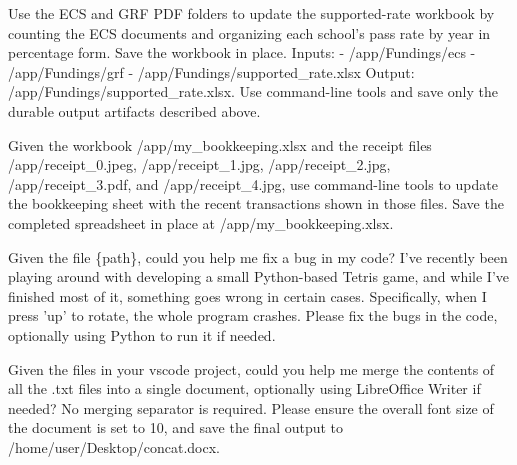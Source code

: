 \documentclass{llmxive}
\begin{document}
\begin{instructionbox}
Use the ECS and GRF PDF folders to update the supported-rate workbook by counting the ECS documents and organizing each school's pass rate by year in percentage form. Save the workbook in place.
Inputs:
- \textasciigrave{}/app/Fundings/ecs\textasciigrave{}
- \textasciigrave{}/app/Fundings/grf\textasciigrave{}
- \textasciigrave{}/app/Fundings/supported\_rate.xlsx\textasciigrave{}
Output: \textasciigrave{}/app/Fundings/supported\_rate.xlsx\textasciigrave{}.
Use command-line tools and save only the durable output artifacts described above.
\end{instructionbox}

\begin{instructionbox}
Given the workbook \textasciigrave{}/app/my\_bookkeeping.xlsx\textasciigrave{} and the receipt files \textasciigrave{}/app/receipt\_0.jpeg\textasciigrave{}, \textasciigrave{}/app/receipt\_1.jpg\textasciigrave{}, \textasciigrave{}/app/receipt\_2.jpg\textasciigrave{}, \textasciigrave{}/app/receipt\_3.pdf\textasciigrave{}, and \textasciigrave{}/app/receipt\_4.jpg\textasciigrave{}, use command-line tools to update the bookkeeping sheet with the recent transactions shown in those files. Save the completed spreadsheet in place at \textasciigrave{}/app/my\_bookkeeping.xlsx\textasciigrave{}.
\end{instructionbox}

\begin{instructionbox}
Given the file \{path\}, could you help me fix a bug in my code? I've recently been playing around with developing a small Python-based Tetris game, and while I've finished most of it, something goes wrong in certain cases. Specifically, when I press 'up' to rotate, the whole program crashes. Please fix the bugs in the code, optionally using Python to run it if needed.
\end{instructionbox}

\begin{instructionbox}
Given the files in your vscode project, could you help me merge the contents of all the .txt files into a single document, optionally using LibreOffice Writer if needed? No merging separator is required. Please ensure the overall font size of the document is set to 10, and save the final output to \textasciigrave{}/home/user/Desktop/concat.docx\textasciigrave{}.
\end{instructionbox}
\end{document}
